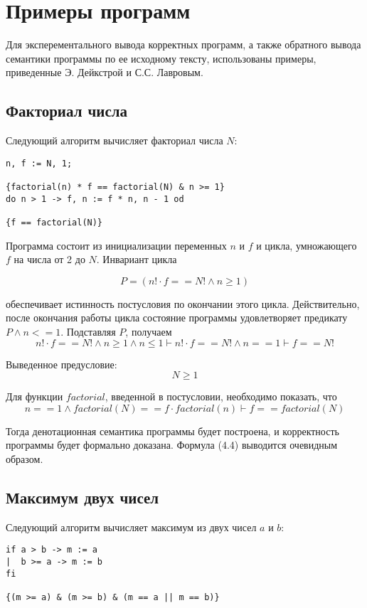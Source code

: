 \chapter{Примеры программ} \label{ch4}

Для эксперементального вывода корректных программ, а также обратного вывода семантики программы
по ее исходному тексту, использованы примеры, приведенные Э. Дейкстрой\cite{Dijkstra} и С.С. Лавровым\cite{Lavrov}.

\section{Факториал числа}
Следующий алгоритм вычисляет факториал числа $N$:
\begin{verbatim}
n, f := N, 1;

{factorial(n) * f == factorial(N) & n >= 1}
do n > 1 -> f, n := f * n, n - 1 od

{f == factorial(N)}
\end{verbatim}

Программа состоит из инициализации переменных $n$ и $f$ и цикла,
умножающего $f$ на числа от 2 до $N$. Инвариант цикла

\begin{equation}
    P = \left( n! \cdot f == N! \wedge n \geq 1 \right)
\end{equation}

обеспечивает истинность постусловия по окончании этого цикла. Действительно,
после окончания работы цикла состояние программы удовлетворяет предикату $P \wedge n <= 1$. Подставляя $P$, получаем
\begin{equation}
n! \cdot f == N! \wedge n \geq 1 \wedge n \leq 1  \vdash n! \cdot f == N! \wedge n == 1 \vdash f == N!
\end{equation}

Выведенное предусловие: 
\begin{equation}
    N \geq 1
\end{equation}

Для функции $factorial$, введенной в постусловии, необходимо показать, что
\begin{equation}
    n == 1 \wedge factorial(N) == f \cdot factorial(n) \vdash f == factorial(N)
\end{equation}

Тогда денотационная семантика программы будет построена, и корректность программы
будет формально доказана. Формула (4.4) выводится очевидным образом.

\section{Максимум двух чисел}
Следующий алгоритм вычисляет максимум из двух чисел $a$ и $b$:
\begin{BVerbatim}
if a > b -> m := a
|  b >= a -> m := b
fi

{(m >= a) & (m >= b) & (m == a || m == b)}
\end{BVerbatim}

